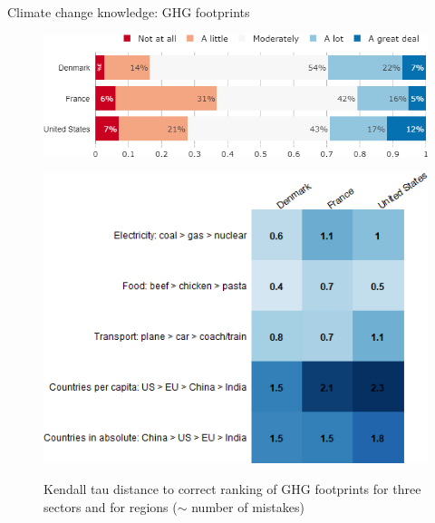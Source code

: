 \documentclass[aspectratio=169,9pt,dvipsnames]{beamer}
\begin{document}
\begin{frame}{Climate change knowledge: GHG footprints}%
\begin{figure}[h!]
\caption{How knowledgeable do you consider yourself about climate change?}
\includegraphics[width=.38\textwidth]{../figures/country_comparison/CC_knowledgeable_countries.png}
\\
\centering
\caption{Kendall tau distance to correct ranking of GHG footprints for three sectors and for regions ($\sim$ number of mistakes)}
\includegraphics[width=.4\textwidth]{../figures/country_comparison/scores_footprint_mean_countries.png} \\
\centering
\end{figure}
\end{frame}


\end{document}

